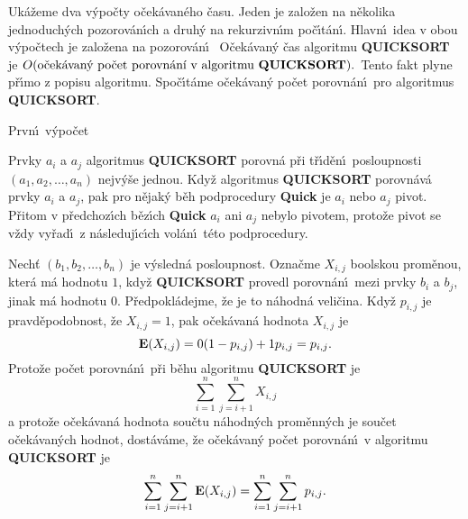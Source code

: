 \flushpar Uk\'a\v zeme dva v\'ypo\v cty o\v cek\'avan\'eho \v casu.  Jeden 
je zalo\v zen na n\v ekolika jednoduch\'ych pozorov\'an\'\i ch a druh\'y 
na rekurzivn\'\i m po\v c\'\i t\'an\'\i .  Hlavn\'\i\ idea v obou 
v\'ypo\v ctech je zalo\v zena na pozorov\'an\'\i\ 
\smallskip
\flushpar O\v cek\'avan\'y \v cas algoritmu {\bf QUICKSORT} je \newline 
$O(\text{\rm o\v cek\'avan\'y po\v cet porovn\'an\'\i\ v algoritmu {\bf QUICKSORT}}
).$
\smallskip
\flushpar Tento fakt plyne p\v r\'\i mo z popisu algoritmu.  Spo\v c\'\i t\'ame 
o\v cek\'a\-van\'y po\v cet porovn\'an\'\i\ pro algoritmus {\bf QUICKSORT}.  
\medskip

\subhead
Prvn\'\i\ v\'ypo\v cet
\endsubhead
\smallskip

\flushpar Prvky $a_i$ a $a_j$ algoritmus {\bf QUICKSORT} porovn\'a 
p\v ri t\v r\'\i d\v en\'\i\ posloupnosti $(a_1,a_2,\dots,a_n)$ nejv\'y\v se jednou.  
Kdy\v z algoritmus {\bf QUICKSORT} porovn\'av\'a prvky $a_i$ a $a_
j$, 
pak pro n\v ejak\'y b\v eh podprocedury {\bf Quick} je $a_i$ nebo $
a_j$ 
pivot.  P\v ritom v p\v redchoz\'\i ch b\v ez\'\i ch {\bf Quick} $
a_i$ ani $a_j$ 
nebylo pivotem, proto\v ze pivot se v\v zdy vy\v rad\'\i\ z n\'asleduj\'\i c\'\i ch 
vol\'an\'\i\ t\'eto podprocedury.
\medskip

\flushpar Nech\v t $(b_1,b_2,\dots,b_n)$ je v\'ysledn\'a posloupnost.  
Ozna\v cme $X_{i,j}$ boolskou prom\v enou, kter\'a m\'a hodnotu $
1$, 
kdy\v z {\bf QUICKSORT} provedl porovn\'an\'\i\ mezi prvky $b_i$ a $
b_j$, 
jinak m\'a hodnotu $0$.  P\v redpokl\'adejme, \v ze je to n\'ahodn\'a 
veli\v cina. Kdy\v z $p_{i,j}$ je prav\-d\v e\-podobnost, \v ze $
X_{i,j}=1$, 
pak o\v cek\'avan\'a hodnota $X_{i,j}$ je 
$$\bold E(X_{i,j})=0(1-p_{i,j})+1p_{i,j}=p_{i,j}.$$
Proto\v ze po\v cet porovn\'an\'\i\ p\v ri b\v ehu algoritmu {\bf QUICKSORT} je
$$\sum_{i=1}^n\sum_{j=i+1}^nX_{i,j}$$
a proto\v ze o\v cek\'avan\'a hodnota sou\v ctu n\'ahodn\'ych 
prom\v enn\'ych je sou\v cet o\v cek\'avan\'ych hodnot, dost\'av\'ame, \v ze 
o\v cek\'avan\'y po\v cet porovn\'an\'\i\ v algoritmu {\bf QUICKSORT} je
$$\sum_{i=1}^n\sum_{j=i+1}^n\bold E(X_{i,j})=\sum_{i=1}^n\sum_{j=
i+1}^np_{i,j}.$$
\medskip

